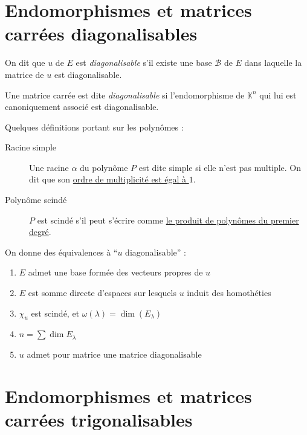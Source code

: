 \documentclass[11pt,a4paper,fleqn,pdftex]{report}
\begin{document}
\section{Endomorphismes et matrices carrées diagonalisables}
\label{sec:diagonalisation}
\begin{dfn}
     On dit que $u$ de $E$ est \emph{diagonalisable} s'il existe une base $\mathcal{B}$ de $E$ dans laquelle la matrice de $u$ est diagonalisable.
\end{dfn}
\begin{dfn}
     Une matrice carrée est dite \emph{diagonalisable} si l'endomorphisme de $\mathbb{K}^n$ qui lui est canoniquement associé est diagonalisable. 
\end{dfn}
%
\begin{dfn}
Quelques définitions portant sur les polynômes : 
    \begin{description}
    \item[Racine simple] Une racine $\alpha$ du polynôme $P$ est dite simple si elle n'est pas multiple. On dit que son \uline{ordre de multiplicité est égal à $1$}.
    \item[Polynôme scindé] $P$ est scindé s'il peut s'écrire comme \uline{le produit de polynômes du premier degré}.
    \end{description}
\end{dfn}
\begin{itheorem}
    On donne des équivalences à ``$u$ diagonalisable'' : 
    \renewcommand{\theenumi}{\roman{enumi}}%
    \begin{enumerate}
        \item $E$ admet une base formée des vecteurs propres de $u$
        \item $E$ est somme directe d'espaces sur lesquels $u$ induit des homothéties
        \item $\chi_u$ est scindé, et $\omega (\lambda ) = \dim (E_\lambda)$
        \item $n = \sum \dim E_\lambda $
        \item $u$ admet pour matrice une matrice diagonalisable
    \end{enumerate}
\end{itheorem}
\section{Endomorphismes et matrices carrées trigonalisables}
\end{document}
